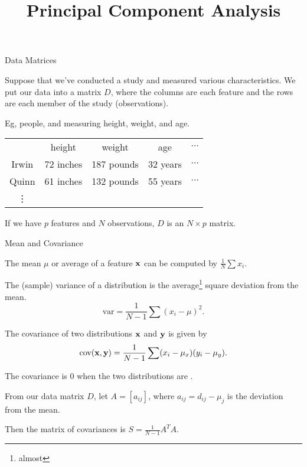 \documentclass[xcolor=dvipsnames,aspectratio=169,t]{beamer}
\title{Principal Component Analysis}
\begin{document}
\maketitle

\begin{frame}{Data Matrices}
  \medskip
  
  Suppose that we've conducted a  study and measured various characteristics.
  We put our data into a matrix $D$, 
  where the columns are each feature and 
  the rows are each member of the study (observations). 
  \bigskip
  
  Eg, people, and measuring height, weight, and age.
  
  \begin{center}
    \begin{tabular}{ccccc}
    & height & weight & age & $\cdots$ \smallskip\\
    Irwin & 72 inches & 187 pounds & 32 years & $\cdots$ \\
    Quinn & 61 inches & 132 pounds & 55 years & $\cdots$ \\
    \vdots & & & & 
    \end{tabular}
  \end{center}
  \bigskip
  
  If we have $p$ features and $N$ observations, $D$ is an $N \times p$ matrix.
  
\end{frame}

\begin{frame}{Mean and Covariance}
  \smallskip
  
  The \alert{mean $\mu$} or average of a feature $\mathbf{x}$ can be computed by $\frac{1}{N} \sum x_i$.
  \medskip
  
  The (sample) \alert{variance} of a distribution is the average\footnote{almost} square deviation from the mean.
  \[ \mbox{var} = \frac{1}{N-1} \sum (x_i-\mu)^2. \]
  
  \pause
  The \alert{covariance} of two distributions $\mathbf{x}$ and $\mathbf{y}$ is given by
  \[ \mbox{cov}(\mathbf{x},\mathbf{y}) = \frac{1}{N-1} \sum (x_i -\mu_x)(y_i-\mu_y). \]
  
  The covariance is $0$ when the two distributions are .
  \bigskip
    
  \pause
  
  From our data matrix $D$, let $A=[ a_{ij}]$, where $a_{ij}=d_{ij}-\mu_j$ is the deviation from the mean.
  \medskip
  
  Then the \alert{matrix of covariances} is $S=\frac{1}{N-1} A^T A$.
\end{frame}
\end{document}
